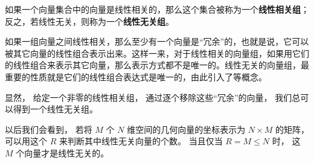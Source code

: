 如果一个向量集合中的向量是线性相关的，那么这个集合被称为一个\textbf{线性相关组}；反之，若线性无关，则称为一个\textbf{线性无关组}。

如果一组向量之间线性相关，那么至少有一个向量是“冗余”的，也就是说，它可以被其它向量的线性组合表示出来。这样一来，对于线性相关的向量组，如果用它们的线性组合来表示其它向量，那么表示方式都不是唯一的。线性无关的向量组，最重要的性质就是它们的线性组合表达式是唯一的，由此引入了等概念。

显然， 给定一个非零的线性相关组， 通过逐个移除这些“冗余”的向量， 我们总可以得到一个线性无关组。

以后我们会看到， 若将 $M$ 个 $N$ 维空间的几何向量的坐标表示为 $N\times M$ 的矩阵， 可以用这个 $R$ 来判断其中线性无关向量的个数。 当且仅当 $R = M \leqslant N$ 时， 这 $M$ 个向量才是线性无关的。

